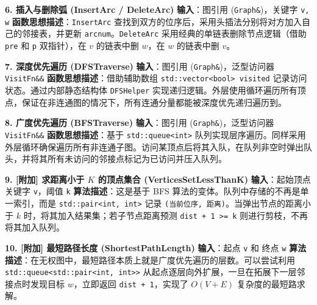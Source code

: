 \documentclass[supercite]{Experimental_Report}
\theoremstyle{definition}
\begin{document}
\vspace{0.5em}
\noindent\textbf{6. 插入与删除弧 (InsertArc / DeleteArc)}
\newline\textbf{输入}：图引用 (\texttt{Graph\&})，关键字 \texttt{v, w}
\newline\textbf{函数思想描述}：\texttt{InsertArc} 查找到双方的位序后，采用头插法分别将对方加入自己的邻接表，并更新 \texttt{arcnum}。\texttt{DeleteArc} 采用经典的单链表删除节点逻辑（借助 \texttt{pre} 和 \texttt{p} 双指针），在 $v$ 的链表中删 $w$，在 $w$ 的链表中删 $v$。

\vspace{0.5em}
\noindent\textbf{7. 深度优先遍历 (DFSTraverse)}
\newline\textbf{输入}：图引用 (\texttt{Graph\&})，泛型访问器 \texttt{VisitFn\&\&}
\newline\textbf{函数思想描述}：借助辅助数组 \texttt{std::vector<bool> visited} 记录访问状态。通过内部静态结构体 \texttt{DFSHelper} 实现递归逻辑。外层使用循环遍历所有顶点，保证在非连通图的情况下，所有连通分量都能被深度优先递归遍历到。

\vspace{0.5em}
\noindent\textbf{8. 广度优先遍历 (BFSTraverse)}
\newline\textbf{输入}：图引用 (\texttt{Graph\&})，泛型访问器 \texttt{VisitFn\&\&}
\newline\textbf{函数思想描述}：基于 \texttt{std::queue<int>} 队列实现层序遍历。同样采用外层循环确保遍历所有非连通子图。访问某顶点后将其入队，在队列非空时弹出队头，并将其所有未访问的邻接点标记为已访问并压入队列。

\vspace{0.5em}
\noindent\textbf{9. [附加] 求距离小于 $K$ 的顶点集合 (VerticesSetLessThanK)}
\newline\textbf{输入}：起始顶点关键字 \texttt{v}，阈值 \texttt{k}
\newline\textbf{算法描述}：这是基于 BFS 算法的变体。队列中存储的不再是单一索引，而是 \texttt{std::pair<int, int>} \cite{cppref} 记录 \texttt{(当前位序, 距离)}。当弹出节点的距离小于 $k$ 时，将其加入结果集；若子节点距离预测 \texttt{dist + 1 >= k} 则进行剪枝，不再将其加入队列。

\vspace{0.5em}
\noindent\textbf{10. [附加] 最短路径长度 (ShortestPathLength)}
\newline\textbf{输入}：起点 \texttt{v} 和 终点 \texttt{w}
\newline\textbf{算法描述}：在无权图中，最短路径本质上就是广度优先遍历的层数。可以尝试利用 \texttt{std::queue<std::pair<int, int>>} 从起点逐层向外扩展，一旦在拓展下一层邻接点时发现目标 $w$，立即返回 \texttt{dist + 1}，实现了 $O(V+E)$ 复杂度的最短路求解。
\end{document}
